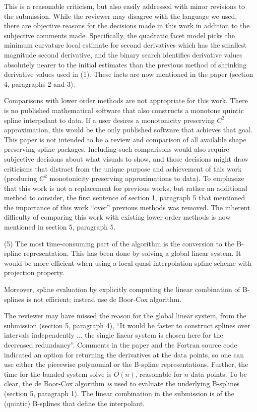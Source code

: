 This is a reasonable criticism, but also easily addressed with minor revisions to the submission. While the reviewer may disagree with the language we used, there are objective reasons for the decisions made in this work in addition to the subjective comments made. Specifically, the quadratic facet model picks the minimum curvature local estimate for second derivatives which has the smallest magnitude second derivative, and the binary search identifies derivative values absolutely nearer to the initial estimates than the previous method of shrinking derivative values used in (1). These facts are now mentioned in the paper (section 4, paragraphs 2 and 3).

Comparisons with lower order methods are not appropriate for this work. There is no published mathematical software that also constructs a monotone quintic spline interpolant to data. If a user desires a monotonicity preserving $C^2$ approximation, this would be the only published software that achieves that goal. This paper is not intended to be a review and comparison of all available shape preserving spline packages. Including such comparisons would also require subjective decisions about what visuals to show, and those decisions might draw criticisms that distract from the unique purpose and achievement of this work (producing $C^2$ monotonicity preserving approximations to data). To emphasize that this work is not a replacement for previous works, but rather an additional method to consider, the first sentence of section 1, paragraph 5 that mentioned the importance of this work ``over'' previous methods was removed. The inherent difficulty of comparing this work with existing lower order methods is now mentioned in section 5, paragraph 5.

{\parindent=20pt \it

\item{(5)} The most time-consuming part of the algorithm is the conversion to the B-spline representation. This has been done by solving a global linear system. It would be more efficient when using a local quasi-interpolation spline scheme with projection property.

\item{} Moreover, spline evaluation by explicitly computing the linear combination of B-splines is not efficient; instead use de Boor-Cox algorithm.

}

The reviewer may have missed the reason for the global linear system, from the submission (section 5, paragraph 4), ``It would be faster to construct splines over intervals independently ... the single linear system is chosen here for the decreased redundancy''. Comments in the paper and the Fortran source code indicated an option for returning the derivatives at the data points, so one can use either the piecewise polynomial or the B-spline representations. Further, the time for the banded system solve is $O(n)$, reasonable for $n$ data points. To be clear, the de Boor-Cox algorithm {\it is} used to evaluate the underlying B-splines (section 5, paragraph 1). The linear combination in the submission is of the (quintic) B-splines that define the interpolant.


